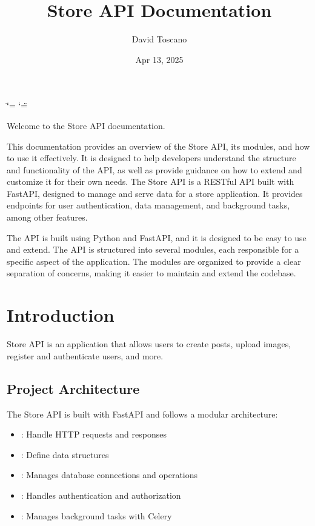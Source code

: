 \documentclass[letterpaper,10pt,openany,oneside,english]{sphinxmanual}
\title{Store API Documentation}
\date{Apr 13, 2025}
\author{David Toscano}
\begin{document}
\ifdefined\shorthandoff
  \ifnum\catcode`\=\string=\active\shorthandoff{=}\fi
  \ifnum\catcode`\"=\active{}\fi
\fi

\pagestyle{empty}
\sphinxmaketitle
\pagestyle{plain}
\setcounter{tocdepth}{3}
\pagestyle{normal}
\label{\detokenize{index::doc}}


\sphinxAtStartPar
Welcome to the Store API documentation.

\sphinxAtStartPar
This documentation provides an overview of the Store API, its modules, and how to use it effectively.
It is designed to help developers understand the structure and functionality of the API, as well as provide guidance on how to extend and customize it for their own needs.
The Store API is a RESTful API built with FastAPI, designed to manage and serve data for a store application.
It provides endpoints for user authentication, data management, and background tasks, among other features.

\sphinxAtStartPar
The API is built using Python and FastAPI, and it is designed to be easy to use and extend.
The API is structured into several modules, each responsible for a specific aspect of the application.
The modules are organized to provide a clear separation of concerns, making it easier to maintain and extend the codebase.

\sphinxstepscope


\chapter{Introduction}
\label{\detokenize{modules/intro:introduction}}\label{\detokenize{modules/intro::doc}}
\sphinxAtStartPar
Store API is an application that allows users to create posts, upload images, register and authenticate users, and more.


\section{Project Architecture}
\label{\detokenize{modules/intro:project-architecture}}
\sphinxAtStartPar
The Store API is built with FastAPI and follows a modular architecture:
\begin{itemize}
\item {} 
\sphinxAtStartPar
{}: Handle HTTP requests and responses

\item {} 
\sphinxAtStartPar
{}: Define data structures

\item {} 
\sphinxAtStartPar
{}: Manages database connections and operations

\item {} 
\sphinxAtStartPar
{}: Handles authentication and authorization

\item {} 
\sphinxAtStartPar
{}: Manages background tasks with Celery

\end{itemize}
\end{document}
